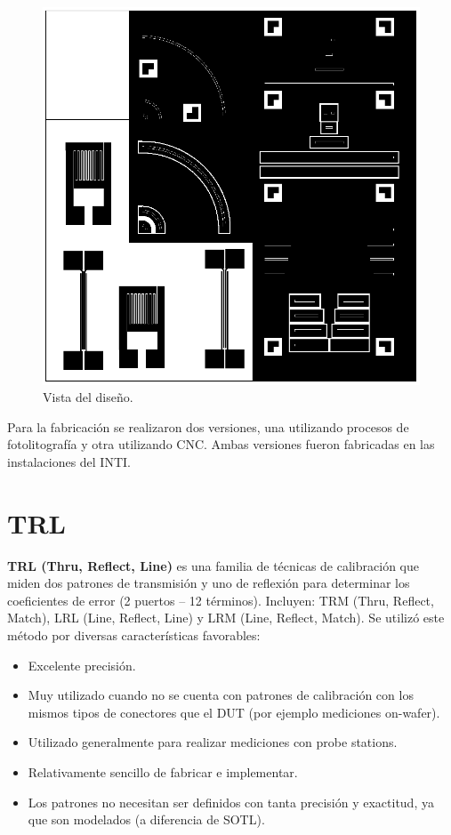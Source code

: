 \documentclass[10pt, a4paper, twocolumn]{article}
\begin{document}
\begin{figure}[hbt!]
	\includegraphics[width=\linewidth]{Fotos/pcb.png}
	\caption{Vista del diseño.}
\end{figure}

Para la fabricación se realizaron dos versiones, una utilizando procesos de fotolitografía
y otra utilizando CNC. Ambas versiones fueron fabricadas en las instalaciones del INTI.

\section{TRL}
\textbf{TRL (Thru, Reflect, Line)} es una familia de técnicas de calibración que
miden dos patrones de transmisión y uno de reflexión para determinar los
coeficientes de error (2 puertos – 12 términos). Incluyen: TRM (Thru, Reflect, Match), LRL (Line, Reflect, Line) y LRM (Line, Reflect, Match). Se utilizó este método por diversas
características favorables:
\begin{itemize}
\item Excelente precisión.
\item Muy utilizado cuando no se cuenta con patrones de calibración con los mismos tipos de conectores que el DUT (por ejemplo mediciones on-wafer).
\item Utilizado generalmente para realizar mediciones con probe stations.
\item Relativamente sencillo de fabricar e implementar.
\item Los patrones no necesitan ser definidos con tanta precisión y exactitud, ya que son modelados (a diferencia de SOTL).
\end{itemize}
\end{document}
